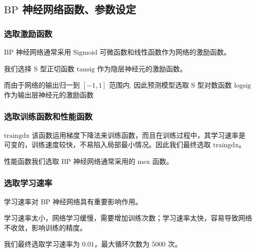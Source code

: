 \subsection{$\mathrm{BP}$ 神经网络函数、参数设定}

  \subsubsection{选取激励函数}

    $\mathrm{BP}$ 神经网络通常采用 $\mathrm{Sigmoid}$ 可微函数和线性函数作为网络的激励函数\cite{Sallybin2013}。

    我们选择 $\mathrm{S}$ 型正切函数 $\mathrm{tansig}$ 作为隐层神经元的激励函数。

    而由于网络的输出归一到 $\left[ -1, 1 \right]$ 范围内, 因此预测模型选取 $\mathrm{S}$ 型对数函数 $\mathrm{logsig}$ 作为输出层神经元的激励函数

  \subsubsection{选取训练函数和性能函数}

    $\mathrm{traingdx}$ 该函数运用梯度下降法来训练函数，而且在训练过程中，其学习速率是可变的，训练速度较快，不易陷入局部最小情况。因此我们最终选取 $\mathrm{traingdx}$。

    性能函数我们选取 $\mathrm{BP}$ 神经网络通常采用的 $\mathrm{mex}$ 函数。

  \subsubsection{选取学习速率}

    学习速率对 $\mathrm{BP}$ 神经网络具有重要影响作用。

    学习速率太小，网络学习缓慢，需要增加训练次数；学习速率太快，容易导致网络不收敛，影响训练的精度\cite{zhangfaming2016}。

    我们最终选取学习速率为 $0.01$，最大循环次数为 $5000$ 次。

